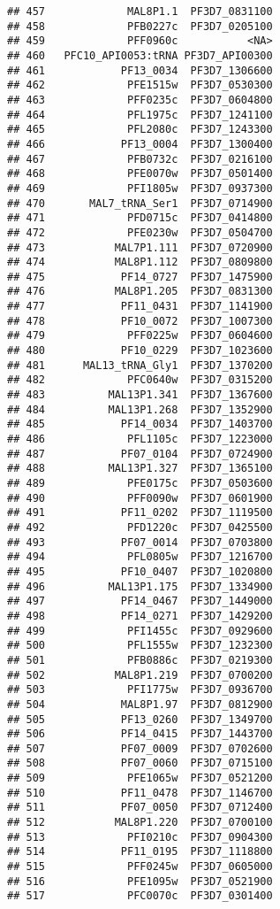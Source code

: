 \documentclass[12pt, a4paper]{article}\usepackage[]{graphicx}\usepackage[]{color}
\makeatletter
\newenvironment{kframe}{%
 \def\at@end@of@kframe{}%
 \ifinner\ifhmode%
  \def\at@end@of@kframe{\end{minipage}}%
  \begin{minipage}{\columnwidth}%
 \fi\fi%
 \def\FrameCommand##1{\hskip\@totalleftmargin \hskip-\fboxsep
 \colorbox{shadecolor}{##1}\hskip-\fboxsep
     \hskip-\linewidth \hskip-\@totalleftmargin \hskip\columnwidth}%
 \MakeFramed {\advance\hsize-\width
   \@totalleftmargin\z@ \linewidth\hsize
   \@setminipage}}%
 {\par\unskip\endMakeFramed%
 \at@end@of@kframe}
\newenvironment{knitrout}{}{} %
\makeatother
\begin{document}
\begin{knitrout}
\begin{kframe}
\begin{verbatim}
## 457             MAL8P1.1  PF3D7_0831100
## 458             PFB0227c  PF3D7_0205100
## 459             PFF0960c           <NA>
## 460   PFC10_API0053:tRNA PF3D7_API00300
## 461            PF13_0034  PF3D7_1306600
## 462             PFE1515w  PF3D7_0530300
## 463             PFF0235c  PF3D7_0604800
## 464             PFL1975c  PF3D7_1241100
## 465             PFL2080c  PF3D7_1243300
## 466            PF13_0004  PF3D7_1300400
## 467             PFB0732c  PF3D7_0216100
## 468             PFE0070w  PF3D7_0501400
## 469             PFI1805w  PF3D7_0937300
## 470       MAL7_tRNA_Ser1  PF3D7_0714900
## 471             PFD0715c  PF3D7_0414800
## 472             PFE0230w  PF3D7_0504700
## 473           MAL7P1.111  PF3D7_0720900
## 474           MAL8P1.112  PF3D7_0809800
## 475            PF14_0727  PF3D7_1475900
## 476           MAL8P1.205  PF3D7_0831300
## 477            PF11_0431  PF3D7_1141900
## 478            PF10_0072  PF3D7_1007300
## 479             PFF0225w  PF3D7_0604600
## 480            PF10_0229  PF3D7_1023600
## 481      MAL13_tRNA_Gly1  PF3D7_1370200
## 482             PFC0640w  PF3D7_0315200
## 483          MAL13P1.341  PF3D7_1367600
## 484          MAL13P1.268  PF3D7_1352900
## 485            PF14_0034  PF3D7_1403700
## 486             PFL1105c  PF3D7_1223000
## 487            PF07_0104  PF3D7_0724900
## 488          MAL13P1.327  PF3D7_1365100
## 489             PFE0175c  PF3D7_0503600
## 490             PFF0090w  PF3D7_0601900
## 491            PF11_0202  PF3D7_1119500
## 492             PFD1220c  PF3D7_0425500
## 493            PF07_0014  PF3D7_0703800
## 494             PFL0805w  PF3D7_1216700
## 495            PF10_0407  PF3D7_1020800
## 496          MAL13P1.175  PF3D7_1334900
## 497            PF14_0467  PF3D7_1449000
## 498            PF14_0271  PF3D7_1429200
## 499             PFI1455c  PF3D7_0929600
## 500             PFL1555w  PF3D7_1232300
## 501             PFB0886c  PF3D7_0219300
## 502           MAL8P1.219  PF3D7_0700200
## 503             PFI1775w  PF3D7_0936700
## 504            MAL8P1.97  PF3D7_0812900
## 505            PF13_0260  PF3D7_1349700
## 506            PF14_0415  PF3D7_1443700
## 507            PF07_0009  PF3D7_0702600
## 508            PF07_0060  PF3D7_0715100
## 509             PFE1065w  PF3D7_0521200
## 510            PF11_0478  PF3D7_1146700
## 511            PF07_0050  PF3D7_0712400
## 512           MAL8P1.220  PF3D7_0700100
## 513             PFI0210c  PF3D7_0904300
## 514            PF11_0195  PF3D7_1118800
## 515             PFF0245w  PF3D7_0605000
## 516             PFE1095w  PF3D7_0521900
## 517             PFC0070c  PF3D7_0301400

\end{verbatim}
\end{kframe}
\end{knitrout}
\end{document}
